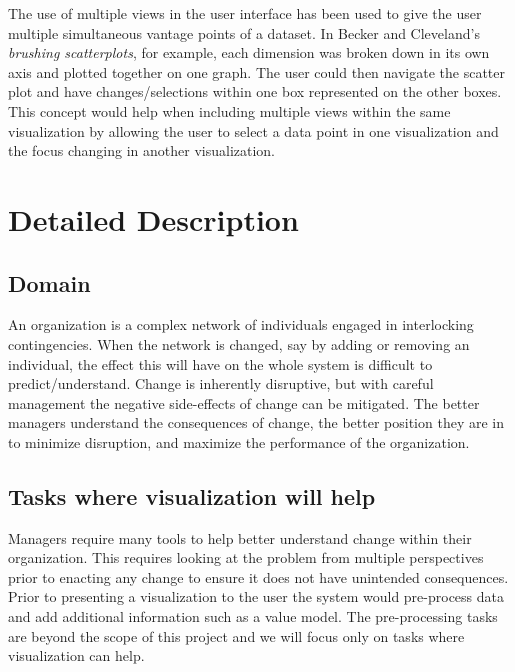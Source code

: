 \documentclass[12pt,letterpaper]{article}
\begin{document}
The use of multiple views in the user interface has been used to give the user multiple simultaneous vantage points of a dataset. In Becker and Cleveland's \emph{brushing scatterplots}\cite{becker1987brushing}, for example, each dimension was broken down in its own axis and plotted together on one graph.  The user could then navigate the scatter plot and have changes/selections within one box represented on the other boxes.  This concept would help when including multiple views within the same visualization by allowing the user to select a data point in one visualization and the focus changing in another visualization.

\section{Detailed Description}

\subsection{Domain}

An organization is a complex network of individuals engaged in interlocking contingencies\cite{glenn2006complexity}. When the network is changed, say by adding or removing an individual, the effect this will have on the whole system is difficult to predict/understand. Change is inherently disruptive, but with careful management the negative side-effects of change can be mitigated. The better managers understand the consequences of change, the better position they are in to minimize disruption, and maximize the performance of the organization. 

\subsection{Tasks where visualization will help}

Managers require many tools to help better understand change within their organization.  This requires looking at the problem from multiple perspectives prior to enacting any change to ensure it does not have unintended consequences.  Prior to presenting a visualization to the user the system would pre-process data and add additional information such as a value model.  The pre-processing tasks are beyond the scope of this project and we will focus only on tasks where visualization can help.
\end{document}
